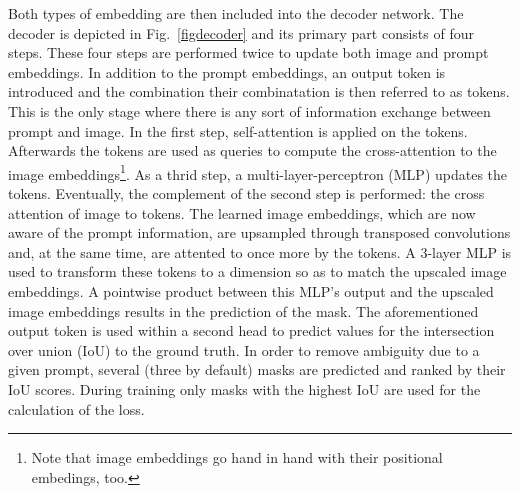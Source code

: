 Both types of embedding are then included into the decoder network. The decoder is depicted in Fig.~\ref{figdecoder} and its primary part consists of four steps. These four steps are performed twice to update both image and prompt embeddings. In addition to the prompt embeddings, an output token is introduced and the combination their combinatation is then referred to as tokens. This is the only stage where there is any sort of information exchange between prompt and image. In the first step, self-attention is applied on the tokens. Afterwards the tokens are used as queries to compute the cross-attention to the image embeddings\footnote{Note that image embeddings go hand in hand with their positional embedings, too.}. As a thrid step, a multi-layer-perceptron (MLP) updates the tokens. Eventually, the complement of the second step is performed: the cross attention of image to tokens. The learned image embeddings, which are now aware of the prompt information, are upsampled through transposed convolutions and, at the same time, are attented to once more by the tokens. A 3-layer MLP is used to transform these tokens to a dimension so as to match the upscaled image embeddings. A pointwise product between this MLP's output and the upscaled image embeddings results in the prediction of the mask. The aforementioned output token is used within a second head to predict values for the intersection over union (IoU) to the ground truth. In order to remove ambiguity due to a given prompt, several (three by default) masks are predicted and ranked by their IoU scores. During training only masks with the highest IoU are used for the calculation of the loss. 

